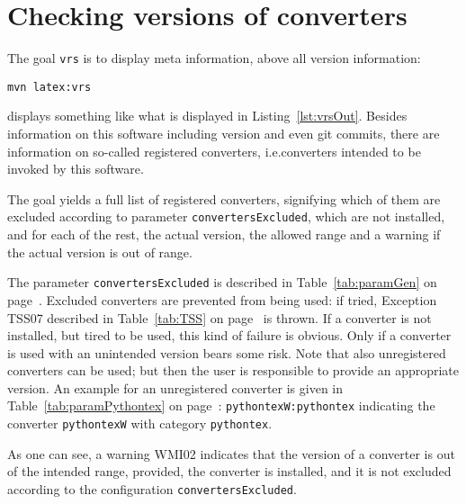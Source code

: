 

\section{Checking versions of converters}\label{sec:chkVersions}

The goal \texttt{vrs} is to display meta information, above all version information:
% 
\begin{Verbatim}
mvn latex:vrs
\end{Verbatim}
%
displays something like what is displayed in Listing~\ref{lst:vrsOut}. 
Besides information on this software including version and even git commits, 
there are information on so-called registered converters, 
i.e.\@ converters intended to be invoked by this software. 

The goal yields a full list of registered converters, 
signifying which of them are excluded 
according to parameter \texttt{convertersExcluded}, 
which are not installed, 
and for each of the rest, the actual version, the allowed range 
and a warning if the actual version is out of range. 

The parameter \texttt{convertersExcluded} 
is described in Table~\ref{tab:paramGen} on page~\pageref{tab:paramGen}. 
Excluded converters are prevented from being used: 
if tried, Exception TSS07 
described in Table~\ref{tab:TSS} on page~\pageref{tab:TSS} is thrown. 
If a converter is not installed, but tired to be used, 
this kind of failure is obvious. 
Only if a converter is used with an unintended version bears some risk. 
Note that also unregistered converters can be used; 
but then the user is responsible to provide an appropriate version. 
An example for an unregistered converter 
is given in Table~\ref{tab:paramPythontex} on page~\pageref{tab:paramPythontex}: 
\texttt{pythontexW:pythontex} 
indicating the converter \texttt{pythontexW} with category \texttt{pythontex}. 


As one can see, a warning WMI02 indicates 
that the version of a converter is out of the intended range, 
provided, the converter is installed, and it is not excluded 
according to the configuration \texttt{convertersExcluded}.

